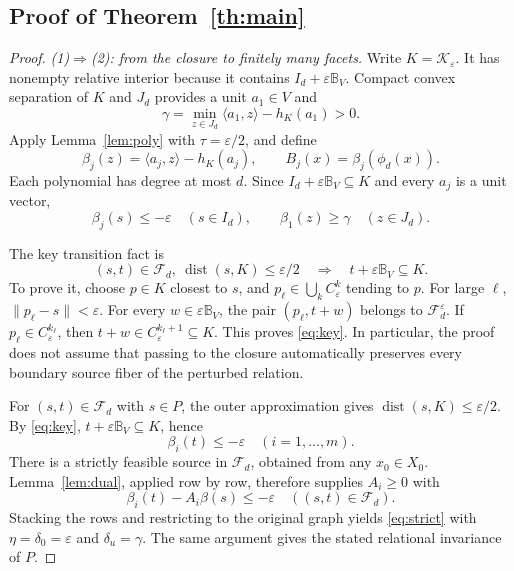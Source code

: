 \documentclass[10pt,letterpaper]{article}
\theoremstyle{remark}
\newcommand{\dist}{\operatorname{dist}}
\newcommand{\ball}{\mathbb B_V}
\newcommand{\F}{\mathcal F_d}
\begin{document}
\subsection{Proof of Theorem~\ref{th:main}}
\begin{proof}
\emph{(1)$\Rightarrow$(2): from the closure to finitely many facets.}
Write $K=\mathcal K_\varepsilon$. It has nonempty relative interior because it contains $I_d+\varepsilon\ball$. Compact convex separation of $K$ and $J_d$ provides a unit $a_1\in V$ and
\begin{equation}\label{eq:anchor}
 \gamma=\min_{z\in J_d}\langle a_1,z\rangle-h_K(a_1)>0.
\end{equation}
Apply Lemma~\ref{lem:poly} with $\tau=\varepsilon/2$, and define
\[
 \beta_j(z)=\langle a_j,z\rangle-h_K(a_j),\qquad
 B_j(x)=\beta_j(\phi_d(x)).
\]
Each polynomial has degree at most $d$. Since $I_d+\varepsilon\ball\subseteq K$ and every $a_j$ is a unit vector,
\[
 \beta_j(s)\leq-\varepsilon\quad(s\in I_d),\qquad
 \beta_1(z)\geq\gamma\quad(z\in J_d).
\]

The key transition fact is
\begin{equation}\label{eq:key}
 (s,t)\in\F,\ \dist(s,K)\leq\varepsilon/2
 \quad\Longrightarrow\quad t+\varepsilon\ball\subseteq K.
\end{equation}
To prove it, choose $p\in K$ closest to $s$, and $p_\ell\in\bigcup_k C_\varepsilon^k$ tending to $p$. For large $\ell$, $\|p_\ell-s\|<\varepsilon$. For every $w\in\varepsilon\ball$, the pair $(p_\ell,t+w)$ belongs to $\mathcal F_d^\varepsilon$. If $p_\ell\in C_\varepsilon^{k_\ell}$, then $t+w\in C_\varepsilon^{k_\ell+1}\subseteq K$. This proves \eqref{eq:key}. In particular, the proof does not assume that passing to the closure automatically preserves every boundary source fiber of the perturbed relation.

For $(s,t)\in\F$ with $s\in P$, the outer approximation gives $\dist(s,K)\leq\varepsilon/2$. By \eqref{eq:key}, $t+\varepsilon\ball\subseteq K$, hence
\[
 \beta_i(t)\leq-\varepsilon\quad(i=1,\ldots,m).
\]
There is a strictly feasible source in $\F$, obtained from any $x_0\in X_0$. Lemma~\ref{lem:dual}, applied row by row, therefore supplies $A_i\geq0$ with
\[
 \beta_i(t)-A_i\beta(s)\leq-\varepsilon\quad((s,t)\in\F).
\]
Stacking the rows and restricting to the original graph yields \eqref{eq:strict} with $\eta=\delta_0=\varepsilon$ and $\delta_u=\gamma$. The same argument gives the stated relational invariance of $P$.


\end{proof}
\end{document}
